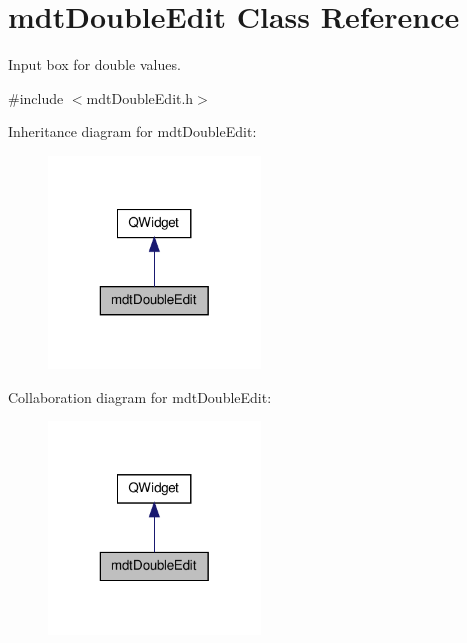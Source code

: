 \hypertarget{classmdt_double_edit}{\section{mdt\-Double\-Edit Class Reference}
\label{classmdt_double_edit}
}


Input box for double values.  




{\ttfamily \#include $<$mdt\-Double\-Edit.\-h$>$}



Inheritance diagram for mdt\-Double\-Edit\-:\nopagebreak
\begin{figure}[H]
\begin{center}
\leavevmode
\includegraphics[width=160pt]{classmdt_double_edit__inherit__graph}
\end{center}
\end{figure}


Collaboration diagram for mdt\-Double\-Edit\-:\nopagebreak
\begin{figure}[H]
\begin{center}
\leavevmode
\includegraphics[width=160pt]{classmdt_double_edit__coll__graph}
\end{center}
\end{figure}
